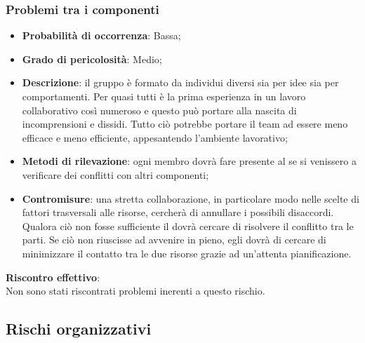 		\subsubsection{Problemi tra i componenti} %
		\label{ssub:problemi_tra_i_componenti}
			\begin{itemize}
				\item \textbf{Probabilità di occorrenza}: Bassa;
				\item \textbf{Grado di pericolosità}: Medio;
				\item \textbf{Descrizione}: il gruppo è formato da individui diversi sia per idee sia per comportamenti. Per quasi tutti è la prima esperienza in un lavoro collaborativo così numeroso e questo può portare alla nascita di incomprensioni e dissidi. Tutto ciò potrebbe portare il team ad essere meno efficace e meno efficiente, appesantendo l'ambiente lavorativo;
				\item \textbf{Metodi di rilevazione}: ogni membro dovrà fare presente al \roleProjectManager{} se si venissero a verificare dei conflitti con altri componenti;
				\item \textbf{Contromisure}: una stretta collaborazione, in particolare modo nelle scelte di fattori trasversali alle risorse, cercherà di annullare i possibili disaccordi. \\
				Qualora ciò non fosse sufficiente il \roleProjectManager{} dovrà cercare di risolvere il conflitto tra le parti. Se ciò non riuscisse ad avvenire in pieno, egli dovrà di cercare di minimizzare il contatto tra le due risorse grazie ad un'attenta pianificazione. \\
			\end{itemize}
		\noindent
		\textbf{Riscontro effettivo}: \\
		Non sono stati riscontrati problemi inerenti a questo rischio.
		
	
	\subsection{Rischi organizzativi} %
	\label{sub:rischi_organizzativi}
